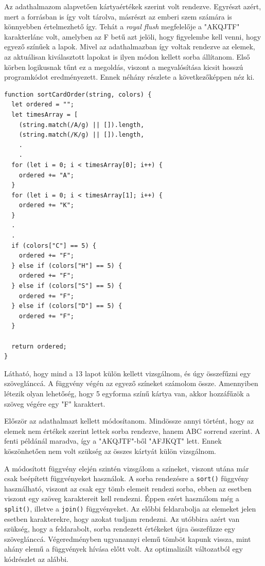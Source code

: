 
Az adathalmazom alapvetően kártyaértékek szerint volt rendezve. Egyrészt azért, mert a forrásban is így volt tárolva, másrészt az emberi szem számára is könnyebben értelmezhető így. Tehát a \textit{royal flush} megfelelője a "AKQJTF" karakterlánc volt, amelyben az F betű azt jelöli, hogy figyelembe kell venni, hogy egyező színűek a lapok. Mivel az adathalmazban így voltak rendezve az elemek, az aktuálisan kiválasztott lapokat is ilyen módon kellett sorba állítanom. Első körben logikusnak tűnt ez a megoldás, viszont a megvalósítása kicsit hosszú programkódot eredményezett. Ennek néhány részlete a következőképpen néz ki.

\begin{lstlisting}[style=htmlcssjs]
function sortCardOrder(string, colors) {
  let ordered = "";
  let timesArray = [
    (string.match(/A/g) || []).length,
    (string.match(/K/g) || []).length,
    .
    .
  for (let i = 0; i < timesArray[0]; i++) {
    ordered += "A";
  }
  for (let i = 0; i < timesArray[1]; i++) {
    ordered += "K";
  }
  .
  .
  if (colors["C"] == 5) {
    ordered += "F";
  } else if (colors["H"] == 5) {
    ordered += "F";
  } else if (colors["S"] == 5) {
    ordered += "F";
  } else if (colors["D"] == 5) {
    ordered += "F";
  }

  return ordered;
}
\end{lstlisting}

Látható, hogy mind a 13 lapot külön kellett vizsgálnom, és úgy összefűzni egy szöveglánccá. A függvény végén az egyező színeket számolom össze. Amennyiben létezik olyan lehetőség, hogy 5 egyforma színű kártya van, akkor hozzáfűzök a szöveg végére egy "F" karaktert.

Először az adathalmazt kellett módosítanom. Mindössze annyi történt, hogy az elemek nem értékek szerint lettek sorba rendezve, hanem ABC sorrend szerint. A fenti példánál maradva, így a "AKQJTF"-ből "AFJKQT" lett. Ennek köszönhetően nem volt szükség az összes kártyát külön vizsgálnom.

A módosított függvény elején szintén vizsgálom a színeket, viszont utána már csak beépített függvényeket használok. A sorba rendezésre a \texttt{sort()} függvény használható, viszont az csak egy tömb elemeit rendezi sorba, ebben az esetben viszont egy szöveg karaktereit kell rendezni. Éppen ezért használom még a \texttt{split()}, illetve a \texttt{join()} függvényeket. Az előbbi feldarabolja az elemeket jelen esetben karakterekre, hogy azokat tudjam rendezni. Az utóbbira azért van szükség, hogy a feldarabolt, sorba rendezett értékeket újra összefűzze egy szöveglánccá. Végeredményben ugyanannyi elemű tömböt kapunk vissza, mint ahány elemű a függvények hívása előtt volt. Az optimalizált változatból egy kódrészlet az alábbi.

